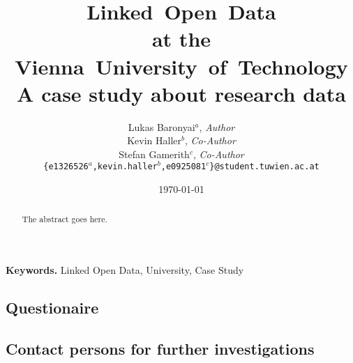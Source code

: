\documentclass[pdftex,a4paper,10pt]{article}
\begin{document}
\pagestyle{plain}
\setlength{\tabcolsep}{10pt}
\title{Linked~Open~Data\\
	   at the\\
	   Vienna~University~of~Technology\\
	   \large A case study about research data}
\author{Lukas Baronyai$^a$, \textit{Author}\\
		Kevin Haller$^b$, \textit{Co-Author}\\
		Stefan Gamerith$^c$, \textit{Co-Author}\\
	\texttt{\{e1326526$^a$,kevin.haller$^b$,e0925081$^c$\}@student.tuwien.ac.at}}
\date{\today}

\maketitle

\begin{abstract}
The abstract goes here.
\end{abstract}

\vfill
\begin{center}
\textbf{Keywords.} Linked Open Data, University, Case Study
\end{center}

\newpage
\tableofcontents
\newpage
\listoffigures
{}








\cleardoublepage
{}
{}


\newpage

\begin{appendices}
	\subsection{Questionaire}
	
	\newpage
	\subsection{Contact persons for further investigations}
	\newpage
\end{appendices}
\end{document}
